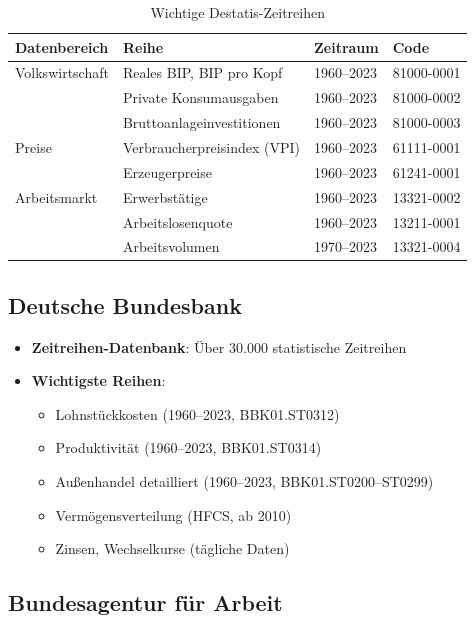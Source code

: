 \begin{table}[ht]
\centering
\begin{tabular}{llll}
\toprule
\textbf{Datenbereich} & \textbf{Reihe} & \textbf{Zeitraum} & \textbf{Code} \\
\midrule
Volkswirtschaft & Reales BIP, BIP pro Kopf & 1960--2023 & 81000-0001 \\
& Private Konsumausgaben & 1960--2023 & 81000-0002 \\
& Bruttoanlageinvestitionen & 1960--2023 & 81000-0003 \\
Preise & Verbraucherpreisindex (VPI) & 1960--2023 & 61111-0001 \\
& Erzeugerpreise & 1960--2023 & 61241-0001 \\
Arbeitsmarkt & Erwerbstätige & 1960--2023 & 13321-0002 \\
& Arbeitslosenquote & 1960--2023 & 13211-0001 \\
& Arbeitsvolumen & 1970--2023 & 13321-0004 \\
\bottomrule
\end{tabular}
\caption{Wichtige Destatis-Zeitreihen}
\label{tab:destatis-reihen}
\end{table}

\subsection{Deutsche Bundesbank}

\begin{itemize}
\item \textbf{Zeitreihen-Datenbank}: Über 30.000 statistische Zeitreihen
\item \textbf{Wichtigste Reihen}:
  \begin{itemize}
  \item Lohnstückkosten (1960--2023, BBK01.ST0312)
  \item Produktivität (1960--2023, BBK01.ST0314)
  \item Außenhandel detailliert (1960--2023, BBK01.ST0200--ST0299)
  \item Vermögensverteilung (HFCS, ab 2010)
  \item Zinsen, Wechselkurse (tägliche Daten)
  \end{itemize}
\end{itemize}

\subsection{Bundesagentur für Arbeit}

